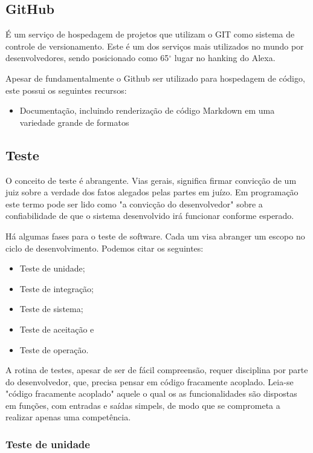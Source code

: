 \documentclass[
	article,			%
	12pt,				%
	oneside,			%
	a4paper,			%
	english,			
	brazil,
	sumario=tradicional
	]{abntex2}
\begin{document}
\pagebreak
\subsection{GitHub}
É um serviço de hospedagem de projetos que utilizam o GIT como sistema de controle de versionamento. Este é um dos serviços mais utilizados no mundo por desenvolvedores, sendo posicionado como 65$^{\circ}$ lugar no hanking do Alexa.

Apesar de fundamentalmente o Github ser utilizado para hospedagem de código, este possui os seguintes recursos:

\begin{itemize}
	\item{Documentação, incluindo renderização de código Markdown em uma variedade grande de formatos}
\end{itemize}

\pagebreak
\subsection{Teste}

O conceito de teste é abrangente. Vias gerais, significa firmar convicção de um juiz sobre a verdade dos fatos alegados pelas partes em juízo. Em programação este termo pode ser lido como "a convicção do desenvolvedor" sobre a confiabilidade de que o sistema desenvolvido irá funcionar conforme esperado.

Há algumas fases para o teste de software. Cada um visa abranger um escopo no ciclo de desenvolvimento. Podemos citar os seguintes:
\begin{itemize}
	\item Teste de unidade;
	\item Teste de integração;
	\item Teste de sistema;
	\item Teste de aceitação e
	\item Teste de operação.
\end{itemize}

A rotina de testes, apesar de ser de fácil compreensão, requer disciplina por parte do desenvolvedor, que, precisa pensar em código fracamente acoplado. Leia-se "código fracamente acoplado" aquele o qual os as funcionalidades são dispostas em funções, com entradas e saídas simpels, de modo que se comprometa a realizar apenas uma competência.

\subsubsection{Teste de unidade}
\end{document}
